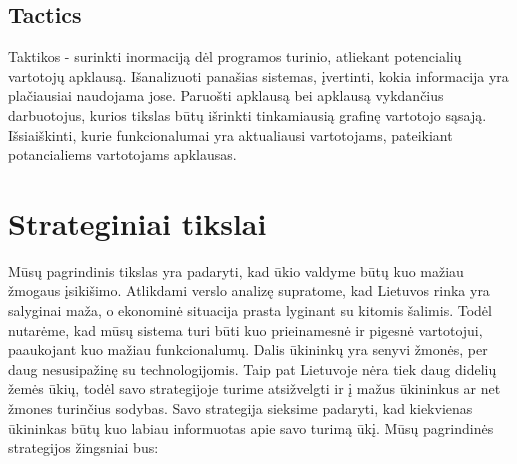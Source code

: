 \documentclass[oneside]{VUMIFPSkursinis}
\begin{document}
\subsection{Tactics}
Taktikos - surinkti inormaciją dėl programos turinio, atliekant potencialių vartotojų apklausą.
Išanalizuoti panašias sistemas, įvertinti, kokia informacija yra plačiausiai naudojama jose.
Paruošti apklausą bei apklausą vykdančius darbuotojus, kurios tikslas būtų išrinkti tinkamiausią grafinę vartotojo sąsają.
Išsiaiškinti, kurie funkcionalumai yra aktualiausi vartotojams, pateikiant potancialiems vartotojams apklausas.
\section{Strateginiai tikslai}
	Mūsų pagrindinis tikslas yra padaryti, kad ūkio valdyme būtų kuo mažiau žmogaus įsikišimo. Atlikdami verslo analizę supratome, kad Lietuvos rinka yra salyginai maža, o ekonominė situacija prasta lyginant su kitomis šalimis. Todėl nutarėme, kad mūsų sistema turi būti kuo prieinamesnė ir pigesnė vartotojui, paaukojant kuo mažiau funkcionalumų. Dalis ūkininkų yra senyvi žmonės, per daug nesusipažinę su technologijomis. Taip pat Lietuvoje nėra tiek daug didelių žemės ūkių, todėl savo strategijoje turime atsižvelgti ir į mažus ūkininkus ar net žmones turinčius sodybas. Savo strategija sieksime padaryti, kad kiekvienas ūkininkas būtų kuo labiau informuotas apie savo turimą ūkį. Mūsų pagrindinės strategijos žingsniai bus:
\end{document}

